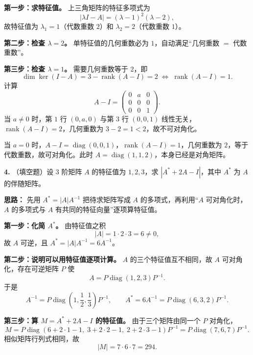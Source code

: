 \textbf{第一步：求特征值。} 上三角矩阵的特征多项式为
\[
|\lambda I-A|=(\lambda-1)^2(\lambda-2),
\]
故特征值为 \(\lambda_1=1\)（代数重数 \(2\)）和 \(\lambda_2=2\)（代数重数 \(1\)）。

\textbf{第二步：检查 \(\lambda=2\)。} 单特征值的几何重数必为 \(1\)，自动满足“几何重数 \(=\) 代数重数”。

\textbf{第三步：检查 \(\lambda=1\)。} 需要几何重数等于 \(2\)，即
\[
\dim\ker(I-A)=3-\operatorname{rank}(A-I)=2
\;\Longleftrightarrow\;
\operatorname{rank}(A-I)=1.
\]
计算
\[
A-I=\begin{pmatrix}0&a&0\\0&0&0\\0&0&1\end{pmatrix}.
\]
当 \(a\neq0\) 时，第 \(1\) 行 \((0,a,0)\) 与第 \(3\) 行 \((0,0,1)\) 线性无关，\(\operatorname{rank}(A-I)=2\)，几何重数为 \(3-2=1<2\)，故不可对角化。

当 \(a=0\) 时，\(A-I=\operatorname{diag}(0,0,1)\)，\(\operatorname{rank}(A-I)=1\)，几何重数为 \(2\)，等于代数重数，故可对角化。此时 \(A=\operatorname{diag}(1,1,2)\)，本身已经是对角矩阵。

\else \answerarea[8] \fi%

\textbf{4.} （填空题）设 \(3\) 阶矩阵 \(A\) 的特征值为 \(1,2,3\)，求 \(|A^{*}+2A-I|\)，其中 \(A^{*}\) 为 \(A\) 的伴随矩阵。

\ifshowsolutions%
\textbf{思路：} 先用 \(A^{*}=|A|A^{-1}\) 把待求矩阵写成 \(A\) 的多项式，再利用“\(A\) 可对角化时，\(A\) 的多项式与 \(A\) 有共同的特征向量”逐项算特征值。

\textbf{第一步：化简 \(A^{*}\)。} 由特征值之积
\[
|A|=1\cdot2\cdot3=6\neq0,
\]
故 \(A\) 可逆，且 \(A^{*}=|A|A^{-1}=6A^{-1}\)。

\textbf{第二步：说明可以用特征值逐项计算。} \(A\) 的三个特征值互不相同，故 \(A\) 可对角化，存在可逆矩阵 \(P\) 使
\[
A=P\operatorname{diag}(1,2,3)P^{-1}.
\]
于是
\[
A^{-1}=P\operatorname{diag}\!\left(1,\frac12,\frac13\right)P^{-1},
\qquad
A^{*}=6A^{-1}=P\operatorname{diag}(6,3,2)P^{-1}.
\]

\textbf{第三步：算 \(M=A^{*}+2A-I\) 的特征值。} 由于三个矩阵由同一个 \(P\) 对角化，
\[
M=P\operatorname{diag}(6+2\cdot1-1,\;3+2\cdot2-1,\;2+2\cdot3-1)P^{-1}
=P\operatorname{diag}(7,6,7)P^{-1}.
\]
相似矩阵行列式相同，故
\[
|M|=7\cdot6\cdot7=294.
\]

\else \answerarea[8] \fi%

